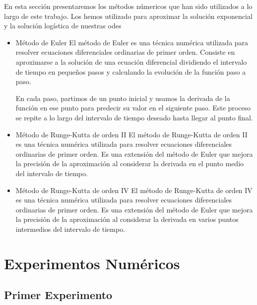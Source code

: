 \documentclass[12pt, letterpaper]{report}
\begin{document}
En esta sección presentaremos los métodos númericos que han sido utilizados a lo largo de este trabajo. Los hemos utilizado para aproximar la solución exponencial y la solución logística de nuestras odes
\begin{itemize}
    \item Método de Euler
    El método de Euler es una técnica numérica utilizada para resolver ecuaciones diferenciales ordinarias de primer orden. Consiste en aproximarse a la solución de una ecuación diferencial dividiendo el intervalo de tiempo en pequeños pasos y calculando la evolución de la función paso a paso.

    En cada paso, partimos de un punto inicial y usamos la derivada de la función en ese punto para predecir su valor en el siguiente paso. Este proceso se repite a lo largo del intervalo de tiempo deseado hasta llegar al punto final.
    \item Método de Runge-Kutta de orden II
    El método de Runge-Kutta de orden II es una técnica numérica utilizada para resolver ecuaciones diferenciales ordinarias de primer orden. Es una extensión del método de Euler que mejora la precisión de la aproximación al considerar la derivada en el punto medio del intervalo de tiempo.
    \item Método de Runge-Kutta de orden IV
    El método de Runge-Kutta de orden IV es una técnica numérica utilizada para resolver ecuaciones diferenciales ordinarias de primer orden. Es una extensión del método de Euler que mejora la precisión de la aproximación al considerar la derivada en varios puntos intermedios del intervalo de tiempo.
\end{itemize}

\section{Experimentos Numéricos}
\subsection*{Primer Experimento}%
\end{document}

